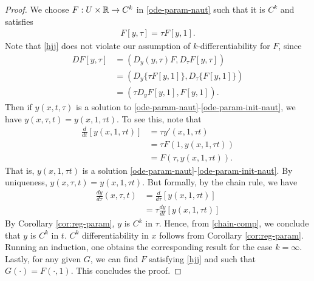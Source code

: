 %
%
\begin{proof}
  We choose $F: U \times \mathbb{R} \to C^{k}$ in \eqref{ode-param-naut}
  such that it is $C^{k}$ and satisfies 
  \begin{equation}
    \label{hjj}
  \begin{split}
    F\left[ y, \tau \right] = \tau F \left[ y, 1 \right].
  \end{split}
  \end{equation}
  Note that \eqref{hjj} does not violate our assumption of $k$-differentiability
  for $F$, since
%
%
\begin{equation*}
\begin{split}
  DF\left[ y, \tau \right]
  & = \left( D_{y}(y, \tau) F, D_{\tau} F[y, \tau] \right)
  \\
  & = (  D_{y} \{\tau F[y, 1] \}, D_{\tau} \{F[y, 1] \} ) 
  \\
  & = ( \tau D_{y} F[y, 1], F[y, 1]).
\end{split}
\end{equation*}
%
%
Then if $y(x, t, \tau)$ is a solution to
\eqref{ode-param-naut}-\eqref{ode-param-init-naut}, we have $y(x, \tau, t ) =
y(x, 1, \tau t)$. To see this, note that
%
%
\begin{equation*}
\begin{split}
\frac{d}{dt}\left[ y(x, 1, \tau t) \right]
& = \tau y'(x, 1, \tau t)
\\
& = \tau F\left( 1, y(x, 1, \tau t) \right)
\\
& = F(\tau, y(x, 1, \tau t)).
\end{split}
\end{equation*}
%
%
That is, $y(x, 1, \tau t)$ is a solution
\eqref{ode-param-naut}-\eqref{ode-param-init-naut}. By uniqueness, $y(x, \tau, t) =
y(x, 1, \tau t)$. But formally, by the chain rule, we have
%
%
\begin{equation}
  \label{chain-comp}
\begin{split}
\frac{dy}{d \tau}(x, \tau, t) 
& = \frac{d}{d \tau}\left[ y(x, 1, \tau t) \right]
\\
& = \tau \frac{dy}{dt}\left[ y(x, 1, \tau t) \right] 
\end{split}
\end{equation}
%
%
By Corollary \ref{cor:reg-param}, $y$ is $C^{k}$ in $\tau$. Hence, from
\eqref{chain-comp}, we conclude that $y$ is $C^{k}$ in $t$. $C^{k}$
differentiability in $x$ follows from Corollary \ref{cor:reg-param}.
Running an induction, one obtains the corresponding result
for the case $k = \infty$. Lastly, for any given $G$, we can find $F$ satisfying
\eqref{hjj} and such that
$G(\cdot) = F(\cdot, 1)$. This concludes the proof.
%
\end{proof}
%
%
